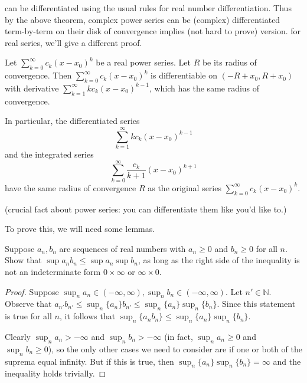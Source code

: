 can be differentiated using the usual rules for real number differentiation. Thus by the above theorem, complex power series can be (complex) differentiated term-by-term on their disk of convergence implies (not hard to prove) version. for real series, we'll give a different proof. 

\begin{theorem}\label{ra.diff.int.power.series}

Let \(\sum_{k=0}^\infty c_k(x - x_0)^k\) be a real power series. Let \(R\) be its radius of convergence. Then \(\sum_{k=0}^\infty c_k (x - x_0)^k\) is differentiable on \((- R + x_0, R + x_0)\) with derivative \(\sum_{k=1}^\infty k c_k(x- x_0)^{k-1}\), which has the same radius of convergence.

In particular, the differentiated series 
\[
\sum_{k=1}^{\infty} kc_k (x-x_0)^{k-1}
\]
and the integrated series 
\[
\sum_{k=0}^{\infty} \frac{c_k}{k+1}(x-x_0)^{k+1}
\]
have the same radius of convergence $R$ as the original series $\sum_{k=0}^{\infty} c_k (x-x_0)^k$.


(crucial fact about power series: you can differentiate them like you'd like to.)

\end{theorem}

To prove this, we will need some lemmas.

\begin{lemma}\label{ra.425b.hw4.lemma.1}


Suppose $a_n, b_n$ are sequences of real numbers with $a_n \geq 0$ and $b_n \geq 0$ for all $n$. Show that $\sup a_n b_n \leq \sup a_n \sup b_n$, as long as the right side of the inequality is not an indeterminate form $0 \times \infty$ or $\infty \times 0$.

\end{lemma}

\begin{proof}

Suppose \(\sup_n a_n \in (-\infty, \infty ), \sup_n b_n \in (-\infty, \infty)\). Let \(n' \in \mathbb{N}\). Observe that \(a_{n'} b_{n'} \leq \sup_n \{a_n\}  b_{n'} \leq  \sup_n \{a_n\}  \sup_n \{b_n\} \). Since this statement is true for all \(n\), it follows that \(\sup_n \{a_n b_n\} \leq   \sup_n \{a_n\}  \sup_n \{b_n\} \).

Clearly \(\sup_n a_n > -\infty\) and \(\sup_n b_n > -\infty\) (in fact, \(\sup_n a_n \geq 0\) and \(\sup_n b_n \geq 0\)), so the only other cases we need to consider are if one or both of the suprema equal infinity. But if this is true, then \(\sup_n \{a_n\} \sup_n \{b_n\} = \infty\) and the inequality holds trivially.


\end{proof}

